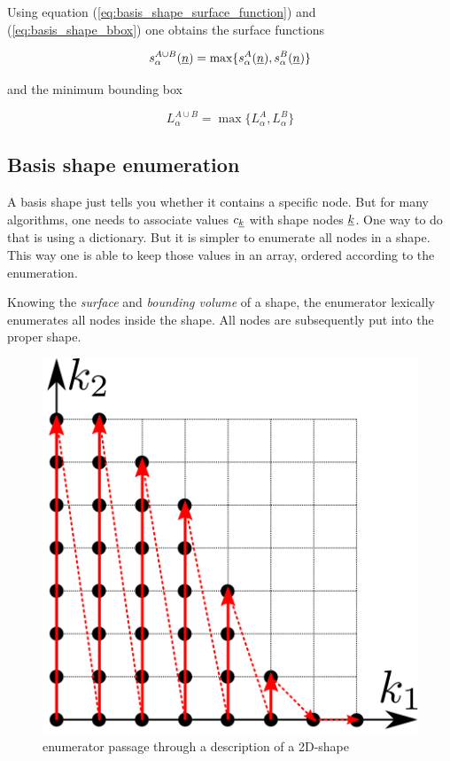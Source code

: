 \documentclass{article}
\begin{document}
Using equation (\ref{eq:basis_shape_surface_function}) and (\ref{eq:basis_shape_bbox})
one obtains the surface functions

\begin{equation}
  s_{\alpha}^{A \cup B}(\underline{n}) = \max\{s_{\alpha}^A(\underline{n}), s_{\alpha}^B(\underline{n})\}
\end{equation}

and the minimum bounding box

\begin{equation}
  L_{\alpha}^{A \cup B} = \max\{L_{\alpha}^{A}, L_{\alpha}^{B}\}
\end{equation}

\subsection{Basis shape enumeration}
A basis shape just tells you whether it contains a specific node. But
for many algorithms, one needs to associate values \(c_{\underline{k}}\) with shape
nodes \(\underline{k}\). One way to do that is using a dictionary. But it is simpler to
enumerate all nodes in a shape.  This way one is able to keep those
values in an array, ordered according to the enumeration.

Knowing the \emph{surface} and \emph{bounding volume} of a shape, the
enumerator lexically enumerates all nodes inside the shape. All nodes
are subsequently put into the proper shape.

\begin{figure}[H]
  \centering
  \includegraphics[]{shape_enumerator}
  \caption{enumerator passage through a description of a 2D-shape}
  \label{fig:shape_example}
\end{figure}
\end{document}
